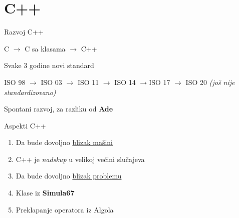 \documentclass{article}
\newenvironment{xitemize}{%
    
    \itemize
    \larger
}{%
    \enditemize
}
\let\olditemize\itemize
\let\endolditemize\enditemize
\renewenvironment{itemize}{%
    \smaller
    \olditemize
}{%
    \endolditemize
}
\begin{document}
\section{C++}
\begin{xitemize}
    \item Razvoj C++
    \begin{itemize}
        \item  C $\rightarrow$ C sa klasama $\rightarrow$ C++
        \item Svake 3 godine novi standard
        \item ISO 98 $\rightarrow$ ISO 03 $\rightarrow$ ISO 11 $\rightarrow$ ISO 14 $\rightarrow$ISO 17 $\rightarrow$ ISO 20 \textit{(još nije standardizovano)}
        \item Spontani razvoj, za razliku od \textbf{Ade}
    \end{itemize}
    
    \item Aspekti C++
    \begin{enumerate}
        \item Da bude dovoljno \underline{blizak mašini}
        \begin{itemize}
            \item C++ je \textit{nadskup} u velikoj većini slučajeva
        \end{itemize}
        \item Da bude dovoljno \underline{blizak problemu}
        \begin{itemize}
            \item Klase iz \textbf{Simula67}
            \item Preklapanje operatora iz Algola
        \end{itemize}
    \end{enumerate}
\end{xitemize}
\newpage
\end{document}
